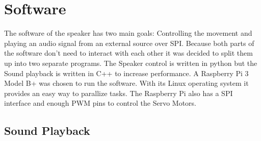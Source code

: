 \chapter{Software}

The software of the speaker has two main goals: Controlling the movement and playing an audio signal from an external source over SPI. Because both parts of the software don't need to interact with each other it was decided to split them up into two separate programs. The Speaker control is written in python but the Sound playback is written in C++ to increase performance.\p
%
A Raspberry Pi 3 Model B+ was chosen to run the software. With its Linux operating system it provides an easy way to parallize tasks. The Raspberry Pi also has a SPI interface and enough PWM pins to control the Servo Motors.\cite{van_loo_bcm2836_2014}

\section{Sound Playback}


